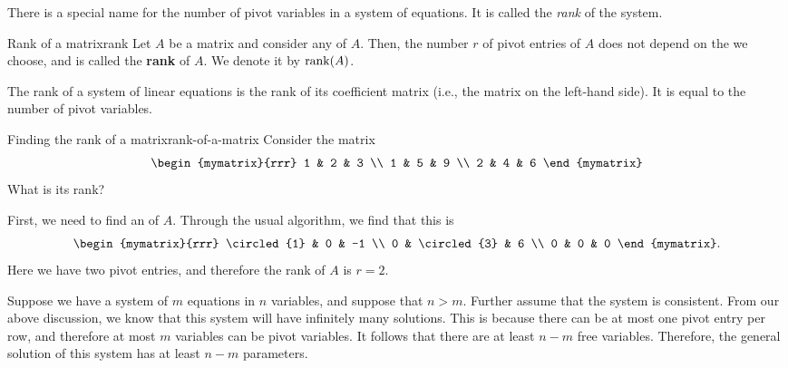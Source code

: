 There is a special name for the number of pivot variables in a system
of equations. It is called the {\em rank} of the system.

\begin{definition}{Rank of a matrix}{rank}
  Let $A$ be a matrix and consider any {\ef} of $A$.  Then, the number
  $r$ of pivot entries of $A$ does not depend on the {\ef} we choose,
  and is called the \textbf{rank}%
   of $A$. We denote it by $\rank(A)$.

  The rank of a system of linear equations is the rank of its
  coefficient matrix (i.e., the matrix on the left-hand side).
  It is equal to the number of pivot variables.
\end{definition}

\begin{example}{Finding the rank of a matrix}{rank-of-a-matrix}
  Consider the matrix
  \begin{equation*}
    \begin{mymatrix}{rrr}
      1 & 2 & 3 \\
      1 & 5 & 9 \\
      2 & 4 & 6
    \end{mymatrix}
  \end{equation*}
  What is its rank?
\end{example}

\begin{solution}
  First, we need to find an {\ef} of $A$. Through the usual algorithm,
  we find that this is
  \begin{equation*}
    \begin{mymatrix}{rrr}
      \circled{1} & 0 & -1 \\
      0 & \circled{3} & 6 \\
      0 & 0 & 0
    \end{mymatrix}.
  \end{equation*}
  Here we have two pivot entries, and therefore the rank of $A$ is
  $r=2$.
\end{solution}

Suppose we have a system of $m$ equations in $n$ variables, and
suppose that $n>m$. Further assume that the system is consistent. From
our above discussion, we know that this system will have infinitely
many solutions. This is because there can be at most one pivot entry
per row, and therefore at most $m$ variables can be pivot
variables. It follows that there are at least $n-m$ free variables.
Therefore, the general solution of this system has at least $n-m$
parameters.

